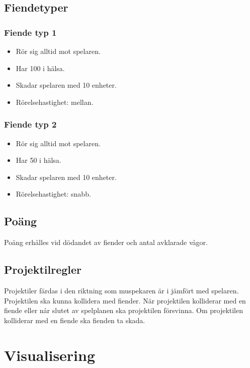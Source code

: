 \documentclass{TDP005mall}
\begin{document}
\subsection{Fiendetyper}

\subsubsection{Fiende typ 1}
\begin{itemize}
\item Rör sig alltid mot spelaren.
\item Har 100 i hälsa.
\item Skadar spelaren med 10 enheter.
\item Rörelsehastighet: mellan.
\end{itemize}

\subsubsection{Fiende typ 2}
\begin{itemize}
\item Rör sig alltid mot spelaren.
\item Har 50 i hälsa.
\item Skadar spelaren med 10 enheter.
\item Rörelsehastighet: snabb.
\end{itemize}

\subsection{Poäng}
Poäng erhålles vid dödandet av fiender och antal avklarade vågor.

\subsection{Projektilregler}
Projektiler färdas i den riktning som muspekaren är i jämfört med spelaren.
Projektilen ska kunna kollidera med fiender.
När projektilen kolliderar med en fiende eller når slutet av spelplanen ska projektilen försvinna.
Om projektilen kolliderar med en fiende ska fienden ta skada.

\section{Visualisering}
\end{document}
